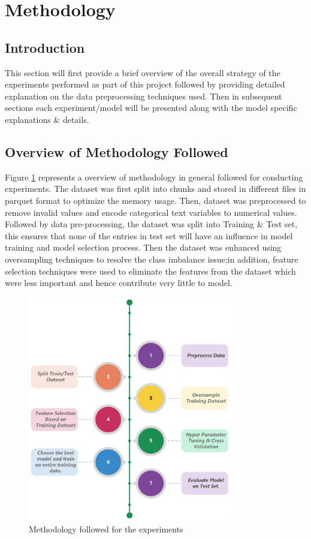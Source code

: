 \documentclass[twoside,11pt,a4paper]{article}
\begin{document}
\vfill
\clearpage
\section{Methodology}\label{sec:methodology}
\subsection{Introduction}
This section will first provide a brief overview of the overall strategy of the experiments performed as part of this project followed by  providing detailed explanation on the data preprocessing techniques used. Then in subsequent sections each experiment/model will be presented along with the model specific explanations \& details.

\subsection{Overview of Methodology Followed}
Figure \ref{fig:methodology} represents a overview of methodology in general followed for conducting experiments. The dataset was first split into chunks and stored in different files in parquet format to optimize the memory usage. Then, dataset was preprocessed to remove invalid values and encode categorical text variables to numerical values. Followed by data pre-processing, the dataset was split into Training \& Test set, this ensures that none of the entries in test set will have an influence in model training and model selection process. Then the dataset was enhanced using oversampling techniques to resolve the class imbalance issue;in addition, feature selection techniques were used to eliminate the features from the dataset which were less important and hence contribute very little to model. 
\begin{figure}[ht]
	\centering
	\includegraphics[width=0.8\textwidth, height=0.5\textheight]{methodology}
	\caption[Methodology]{Methodology followed for the experiments}
	\label{fig:methodology}
\end{figure}
\end{document}
